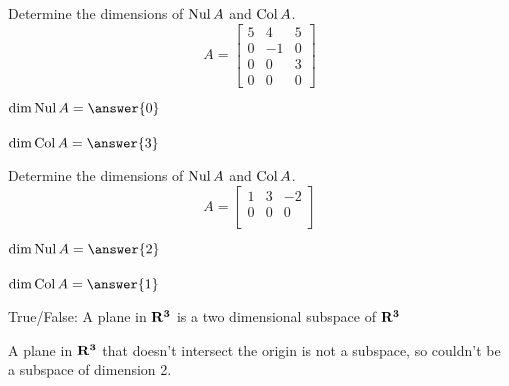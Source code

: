 \documentclass{ximera}
\newcommand{\RR}{\bf R}
\def\Nul{\mathop{\rm Nul}}
\def\Col{\mathop{\rm Col}}
\def\dim{\mathop{\rm dim}}
\begin{document}
  	  		        \begin{question} Determine the dimensions of $\Nul A$ and $\Col A$.
  	  		        	$$A = \begin{bmatrix} 5&4&5\\ 0&-1 &0\\0&0&3\\0&0&0 \end{bmatrix}$$
  	  		        	
  	  		        	$\dim \Nul A =  \answer{0}$\\
  	  		        	\\
  	  		        	$\dim \Col A =  \answer{3}$\\
  	  		        	
  	  		        \end{question}	
  	  		             \begin{question} Determine the dimensions of $\Nul A$ and $\Col A$.
  	  		             	$$A = \begin{bmatrix} 1&3&-2\\ 0&0 &0\\ \end{bmatrix}$$
  	  		             	
  	  		             	$\dim \Nul A =  \answer{2}$\\
  	  		             	\\
  	  		             	$\dim \Col A =  \answer{1}$\\
  	  		             	
  	  		             \end{question}	
  
        \begin{question} True/False: A plane in $\RR^3$ is a two dimensional subspace of $\RR^3$
        	
        	\begin{multipleChoice}
        		\end{multipleChoice}
        	\vspace{10pt}
        	\begin{hint}
        		A plane in $\RR^3$ that doesn't intersect the origin is not a subspace, so couldn't be a subspace of dimension 2.
        		\end{hint}	
        		
        	
        \end{question}	
        
\end{document}

